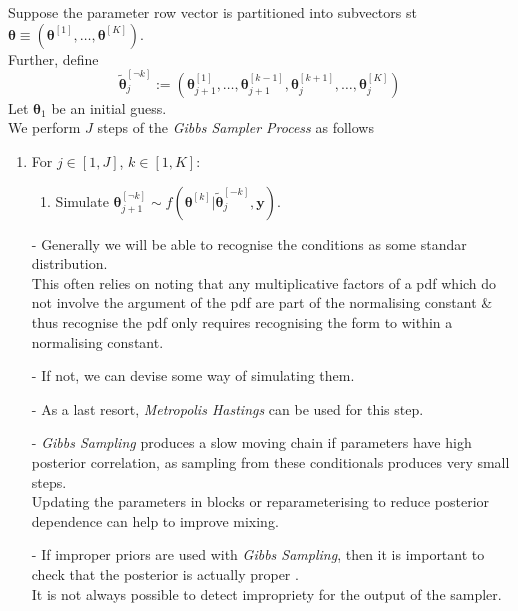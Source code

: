 \documentclass[11pt,a4paper]{article}
\begin{document}
Suppose the parameter row vector is partitioned into subvectors st $\pmb\theta\equiv(\pmb\theta^{[1]},\dots,\pmb\theta^{[K]})$.\\
Further, define $$\tilde{\pmb\theta}_j^{[\neg k]}:=(\pmb\theta_{j+1}^{[1]},\dots,\pmb\theta_{j+1}^{[k-1]},\pmb\theta_{j}^{[k+1]},\dots,\pmb\theta_{j}^{[K]})$$
Let $\pmb\theta_1$ be an initial guess.\\
We perform $J$ steps of the \textit{Gibbs Sampler Process} as follows
\begin{enumerate}
	\item For $j\in[1,J]$, $k\in[1,K]$:
	\begin{enumerate}
		\item Simulate $\pmb\theta_{j+1}^{[\neg k]}\sim f(\pmb\theta^{[k]}|\tilde{\pmb\theta}_j^{[-k]},\textbf{y})$.\\
		\nb {}
	\end{enumerate}
\end{enumerate}

\begin{itemize}
	\item[-] Generally we will be able to recognise the conditions as some standar distribution.\\
	This often relies on noting that any multiplicative factors of a pdf which do not involve the argument of the pdf are part of the normalising constant \& thus recognise the pdf only requires recognising the form to within a normalising constant.
	\item[-] If not, we can devise some way of simulating them.
	\item[-] As a last resort, \textit{Metropolis Hastings} can be used for this step.
\end{itemize}

\begin{itemize}
	\item[-] \textit{Gibbs Sampling} produces a slow moving chain if parameters have high posterior correlation, as sampling from these conditionals produces very small steps.\\
Updating the parameters in blocks or reparameterising to reduce posterior dependence can help to improve mixing.
	\item[-] If improper priors are used with \textit{Gibbs Sampling}, then it is important to check that the posterior is actually proper .\\
	It is not always possible to detect impropriety for the output of the sampler.
\end{itemize}
\end{document}
